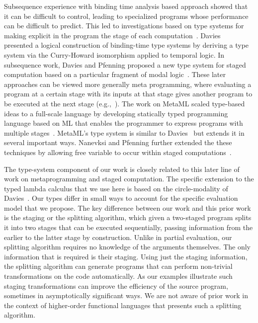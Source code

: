 Subsequence experience with binding time analysis based approach
showed that it can be difficult to control, leading to specialized
programs whose performance can be difficult to predict. This led to
investigations based on type systems for making explicit in the
program the stage of each
computation~\cite{GJ91-lambda,NN92-twolevel}.  Davies~\cite{Davies96}
presented a logical construction of binding-time type systems by
deriving a type system via the Curry-Howard isomorphism applied to
temporal logic.  In subsequence work, Davies and Pfenning proposed a
new type system for staged computation based on a particular fragment
of modal logic~\cite{DP01-modal}.  These later approaches can be
viewed more generally meta programming, where evaluating a program at
a certain stage with its inputs at that stage gives another program to
be executed at the next stage (e.g.,~\cite{JS86-staging}). The work on
MetaML scaled type-based ideas to a full-scale language by developing
statically typed programming language based on ML that enables the
programmer to express programs with multiple
stages~\cite{Taha97,taha-thesis-99}.  MetaML's type system is similar
to Davies~\cite{Davies96} but extends it in several important ways.
Nanevksi and Pfenning further extended the these techniques by
allowing free variable to occur within staged
computations~\cite{NP05-nn}.

The type-system component of our work is closely related to this later
line of work on metaprogramming and staged computation.  The specific
extension to the typed lambda calculus that we use here is based on
the circle-modality of Davies~\cite{DP01-modal}.  Our types differ in
small ways to account for the specific evaluation model that we
propose.  The key difference between our work and this prior work is
the staging or the splitting algorithm, which given a two-staged
program splits it into two stages that can be executed sequentially,
passing information from the earlier to the latter stage by
construction. 
%
%
Unlike in partial evaluation, our splitting algorithm requires no
knowledge of the arguments themselves. The only information that is
required is their staging. Using just the staging information, the
splitting algorithm can generate programs that can perform non-trivial
transformations on the code automatically.  As our examples illustrate
such staging transformations can improve the efficiency of the source
program, sometimes in asymptotically significant ways.  
We are not aware of prior work in the context of higher-order
functional languages that presents such a splitting algorithm.

